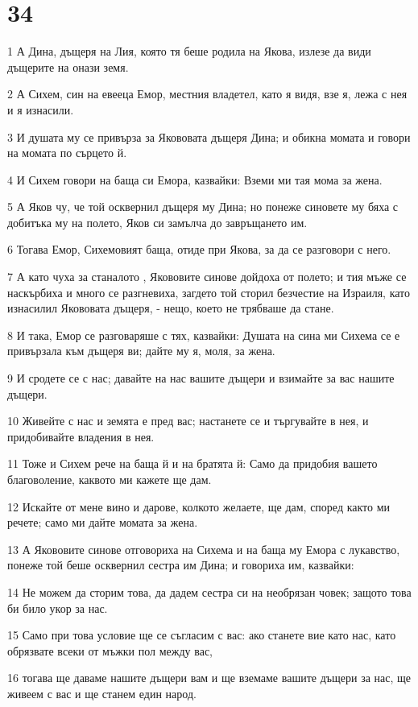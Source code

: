 \chapter{34}

\par 1 А Дина, дъщеря на Лия, която тя беше родила на Якова, излезе да види дъщерите на онази земя.
\par 2 А Сихем, син на евееца Емор, местния владетел, като я видя, взе я, лежа с нея и я изнасили.
\par 3 И душата му се привърза за Якововата дъщеря Дина; и обикна момата и говори на момата по сърцето й.
\par 4 И Сихем говори на баща си Емора, казвайки: Вземи ми тая мома за жена.
\par 5 А Яков чу, че той осквернил дъщеря му Дина; но понеже синовете му бяха с добитъка му на полето, Яков си замълча до завръщането им.
\par 6 Тогава Емор, Сихемовият баща, отиде при Якова, за да се разговори с него.
\par 7 А като чуха за станалото , Якововите синове дойдоха от полето; и тия мъже се наскърбиха и много се разгневиха, загдето той сторил безчестие на Израиля, като изнасилил Якововата дъщеря, - нещо, което не трябваше да стане.
\par 8 И така, Емор се разговаряше с тях, казвайки: Душата на сина ми Сихема се е привързала към дъщеря ви; дайте му я, моля, за жена.
\par 9 И сродете се с нас; давайте на нас вашите дъщери и взимайте за вас нашите дъщери.
\par 10 Живейте с нас и земята е пред вас; настанете се и търгувайте в нея, и придобивайте владения в нея.
\par 11 Тоже и Сихем рече на баща й и на братята й: Само да придобия вашето благоволение, каквото ми кажете ще дам.
\par 12 Искайте от мене вино и дарове, колкото желаете, ще дам, според както ми речете; само ми дайте момата за жена.
\par 13 А Якововите синове отговориха на Сихема и на баща му Емора с лукавство, понеже той беше осквернил сестра им Дина; и говориха им, казвайки:
\par 14 Не можем да сторим това, да дадем сестра си на необрязан човек; защото това би било укор за нас.
\par 15 Само при това условие ще се съгласим с вас: ако станете вие като нас, като обрязвате всеки от мъжки пол между вас,
\par 16 тогава ще даваме нашите дъщери вам и ще вземаме вашите дъщери за нас, ще живеем с вас и ще станем един народ.
